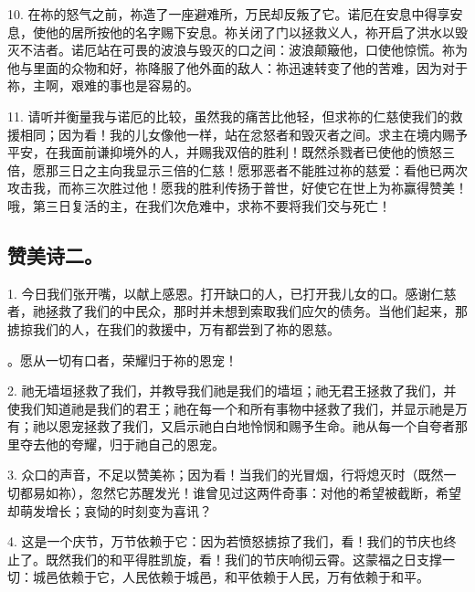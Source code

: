 10. 在祢的怒气之前，祢造了一座避难所，万民却反叛了它。诺厄在安息中得享安息，使他的居所按他的名字赐下安息。祢关闭了门以拯救义人，祢开启了洪水以毁灭不洁者。诺厄站在可畏的波浪与毁灭的口之间：波浪颠簸他，口使他惊慌。祢为他与里面的众物和好，祢降服了他外面的敌人：祢迅速转变了他的苦难，因为对于祢，主啊，艰难的事也是容易的。\par

11. 请听并衡量我与诺厄的比较，虽然我的痛苦比他轻，但求祢的仁慈使我们的救援相同；因为看！我的儿女像他一样，站在忿怒者和毁灭者之间。求主在境内赐予平安，在我面前谦抑境外的人，并赐我双倍的胜利！既然杀戮者已使他的愤怒三倍，愿那三日之主向我显示三倍的仁慈！愿邪恶者不能胜过祢的慈爱：看他已两次攻击我，而祢三次胜过他！愿我的胜利传扬于普世，好使它在世上为祢赢得赞美！哦，第三日复活的主，在我们次危难中，求祢不要将我们交与死亡！\par


\subsection{赞美诗二。}

1. 今日我们张开嘴，以献上感恩。打开缺口的人，已打开我儿女的口。感谢仁慈者，祂拯救了我们的中民众，那时并未想到索取我们应欠的债务。当他们起来，那掳掠我们的人，在我们的救援中，万有都尝到了祢的恩慈。\par

。愿从一切有口者，荣耀归于祢的恩宠！\par

2. 祂无墙垣拯救了我们，并教导我们祂是我们的墙垣；祂无君王拯救了我们，并使我们知道祂是我们的君王；祂在每一个和所有事物中拯救了我们，并显示祂是万有；祂以恩宠拯救了我们，又启示祂白白地怜悯和赐予生命。祂从每一个自夸者那里夺去他的夸耀，归于祂自己的恩宠。\par

3. 众口的声音，不足以赞美祢；因为看！当我们的光冒烟，行将熄灭时（既然一切都易如祢），忽然它苏醒发光！谁曾见过这两件奇事：对他的希望被截断，希望却萌发增长；哀恸的时刻变为喜讯？\par

4. 这是一个庆节，万节依赖于它：因为若愤怒掳掠了我们，看！我们的节庆也终止了。既然我们的和平得胜凯旋，看！我们的节庆响彻云霄。这蒙福之日支撑一切：城邑依赖于它，人民依赖于城邑，和平依赖于人民，万有依赖于和平。\par

